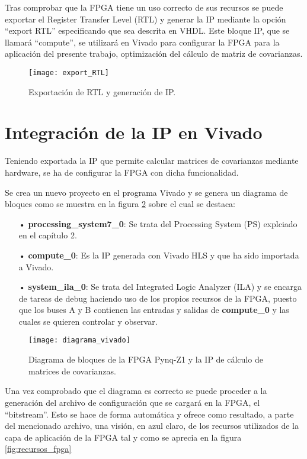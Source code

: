 Tras comprobar que la FPGA tiene un uso correcto de sus recursos se puede exportar el Register Transfer Level (RTL) y generar la IP mediante la opción ``export RTL'' especificando que sea descrita en VHDL. Este bloque IP, que se llamará ``compute'', se utilizará en Vivado para configurar la FPGA para la aplicación del presente trabajo, optimización del cálculo de matriz de covarianzas.

\begin{figure}
\centering
\texttt{[image: export\_RTL]}
\caption{Exportación de RTL y generación de IP.}\label{fig:export_RTL}
\end{figure}

\section{Integración de la IP en Vivado}
Teniendo exportada la IP que permite calcular matrices de covarianzas mediante hardware, se ha de configurar la FPGA con dicha funcionalidad.

Se crea un nuevo proyecto en el programa Vivado y se genera un diagrama de bloques como se muestra en la figura \ref{fig:diagrama_vivado} sobre el cual se destaca:
\begin{itemize}
\item[•] \textbf{processing\_system7\_0}: Se trata del Processing System (PS) explciado en el capítulo 2.
\item[•] \textbf{compute\_0}: Es la IP generada con Vivado HLS y que ha sido importada a Vivado.
\item[•] \textbf{system\_ila\_0}: Se trata del Integrated Logic Analyzer (ILA) y se encarga de tareas de debug haciendo uso de los propios recursos de la FPGA, puesto que los buses A y B contienen las entradas y salidas de \textbf{compute\_0} y las cuales se quieren controlar y observar.
\end{itemize}


\begin{figure}
\centering
\texttt{[image: diagrama\_vivado]}
\caption{Diagrama de bloques de la FPGA Pynq-Z1 y la IP de cálculo de matrices de covarianzas.}\label{fig:diagrama_vivado}
\end{figure}

Una vez comprobado que el diagrama es correcto se puede proceder a la generación del archivo de configuración que se cargará en la FPGA, el ``bitstream''. Esto se hace de forma automática y ofrece como resultado, a parte del mencionado archivo, una visión, en azul claro, de los recursos utilizados de la capa de aplicación de la FPGA tal y como se aprecia en la figura \ref{fig:recursos_fpga}

